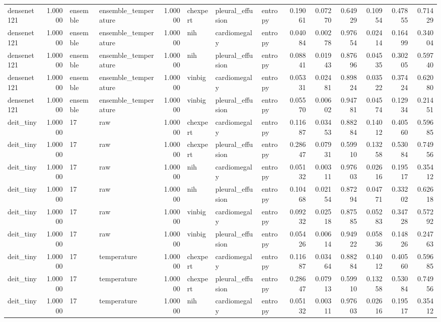 \begin{tabular}{lrllrlllrrrrrr}
densenet121 & 1.00000 & ensemble & ensemble\_temperature & 1.00000 & chexpert & pleural\_effusion & entropy & 0.19061 & 0.07270 & 0.64929 & 0.10954 & 0.47855 & 0.71429 \\
densenet121 & 1.00000 & ensemble & ensemble\_temperature & 1.00000 & nih & cardiomegaly & entropy & 0.04084 & 0.00278 & 0.97654 & 0.02414 & 0.16499 & 0.34004 \\
densenet121 & 1.00000 & ensemble & ensemble\_temperature & 1.00000 & nih & pleural\_effusion & entropy & 0.08841 & 0.01943 & 0.87696 & 0.04535 & 0.30205 & 0.59740 \\
densenet121 & 1.00000 & ensemble & ensemble\_temperature & 1.00000 & vinbig & cardiomegaly & entropy & 0.05331 & 0.02481 & 0.89824 & 0.03522 & 0.37424 & 0.62080 \\
densenet121 & 1.00000 & ensemble & ensemble\_temperature & 1.00000 & vinbig & pleural\_effusion & entropy & 0.05570 & 0.00602 & 0.94781 & 0.04574 & 0.12934 & 0.21451 \\
deit\_tiny & 1.00000 & 17 & raw & 1.00000 & chexpert & cardiomegaly & entropy & 0.11687 & 0.03453 & 0.88284 & 0.14012 & 0.40560 & 0.59685 \\
deit\_tiny & 1.00000 & 17 & raw & 1.00000 & chexpert & pleural\_effusion & entropy & 0.28647 & 0.07931 & 0.59910 & 0.13258 & 0.53084 & 0.74956 \\
deit\_tiny & 1.00000 & 17 & raw & 1.00000 & nih & cardiomegaly & entropy & 0.05132 & 0.00311 & 0.97603 & 0.02616 & 0.19517 & 0.35412 \\
deit\_tiny & 1.00000 & 17 & raw & 1.00000 & nih & pleural\_effusion & entropy & 0.10468 & 0.02154 & 0.87294 & 0.04771 & 0.33202 & 0.62618 \\
deit\_tiny & 1.00000 & 17 & raw & 1.00000 & vinbig & cardiomegaly & entropy & 0.09232 & 0.02518 & 0.87585 & 0.05283 & 0.34728 & 0.57292 \\
deit\_tiny & 1.00000 & 17 & raw & 1.00000 & vinbig & pleural\_effusion & entropy & 0.05426 & 0.00614 & 0.94922 & 0.05836 & 0.14826 & 0.24763 \\
deit\_tiny & 1.00000 & 17 & temperature & 1.00000 & chexpert & cardiomegaly & entropy & 0.11687 & 0.03464 & 0.88284 & 0.14012 & 0.40560 & 0.59685 \\
deit\_tiny & 1.00000 & 17 & temperature & 1.00000 & chexpert & pleural\_effusion & entropy & 0.28647 & 0.07913 & 0.59910 & 0.13258 & 0.53084 & 0.74956 \\
deit\_tiny & 1.00000 & 17 & temperature & 1.00000 & nih & cardiomegaly & entropy & 0.05132 & 0.00311 & 0.97603 & 0.02616 & 0.19517 & 0.35412 \\

\end{tabular}
